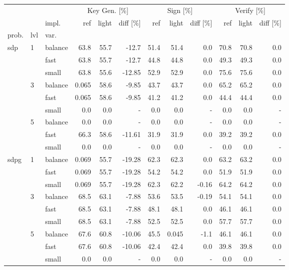 \begin{tabular}{lll|r|r|r|r|r|r|r|r|r|}
\toprule
 &  &  & \multicolumn{3}{c}{Key Gen. [\%]} & \multicolumn{3}{c}{Sign [\%]} & \multicolumn{3}{c}{Verify [\%]} \\
 &  & impl. & ref & light & diff [\%] & ref & light & diff [\%] & ref & light & diff [\%] \\
prob. & lvl & var. &  &  &  &  &  &  &  &  &  \\
\midrule
\multirow[c]{9}{*}{sdp} & \multirow[c]{3}{*}{1} & balance & 63.8 & 55.7 & -12.7 & 51.4 & 51.4 & 0.0 & 70.8 & 70.8 & 0.0 \\
 &  & fast & 63.8 & 55.7 & -12.7 & 44.8 & 44.8 & 0.0 & 49.3 & 49.3 & 0.0 \\
 &  & small & 63.8 & 55.6 & -12.85 & 52.9 & 52.9 & 0.0 & 75.6 & 75.6 & 0.0 \\
\cline{2-12}
 & \multirow[c]{3}{*}{3} & balance & 0.065 & 58.6 & -9.85 & 43.7 & 43.7 & 0.0 & 65.2 & 65.2 & 0.0 \\
 &  & fast & 0.065 & 58.6 & -9.85 & 41.2 & 41.2 & 0.0 & 44.4 & 44.4 & 0.0 \\
 &  & small & 0.0 & 0.0 & - & 0.0 & 0.0 & - & 0.0 & 0.0 & - \\
\cline{2-12}
 & \multirow[c]{3}{*}{5} & balance & 0.0 & 0.0 & - & 0.0 & 0.0 & - & 0.0 & 0.0 & - \\
 &  & fast & 66.3 & 58.6 & -11.61 & 31.9 & 31.9 & 0.0 & 39.2 & 39.2 & 0.0 \\
 &  & small & 0.0 & 0.0 & - & 0.0 & 0.0 & - & 0.0 & 0.0 & - \\
\cline{1-12} \cline{2-12}
\multirow[c]{9}{*}{sdpg} & \multirow[c]{3}{*}{1} & balance & 0.069 & 55.7 & -19.28 & 62.3 & 62.3 & 0.0 & 63.2 & 63.2 & 0.0 \\
 &  & fast & 0.069 & 55.7 & -19.28 & 54.2 & 54.2 & 0.0 & 51.9 & 51.9 & 0.0 \\
 &  & small & 0.069 & 55.7 & -19.28 & 62.3 & 62.2 & -0.16 & 64.2 & 64.2 & 0.0 \\
\cline{2-12}
 & \multirow[c]{3}{*}{3} & balance & 68.5 & 63.1 & -7.88 & 53.6 & 53.5 & -0.19 & 54.1 & 54.1 & 0.0 \\
 &  & fast & 68.5 & 63.1 & -7.88 & 48.1 & 48.1 & 0.0 & 46.1 & 46.1 & 0.0 \\
 &  & small & 68.5 & 63.1 & -7.88 & 52.5 & 52.5 & 0.0 & 57.7 & 57.7 & 0.0 \\
\cline{2-12}
 & \multirow[c]{3}{*}{5} & balance & 67.6 & 60.8 & -10.06 & 45.5 & 0.045 & -1.1 & 46.1 & 46.1 & 0.0 \\
 &  & fast & 67.6 & 60.8 & -10.06 & 42.4 & 42.4 & 0.0 & 39.8 & 39.8 & 0.0 \\
 &  & small & 0.0 & 0.0 & - & 0.0 & 0.0 & - & 0.0 & 0.0 & - \\
\cline{1-12} \cline{2-12}
\bottomrule
\end{tabular}
